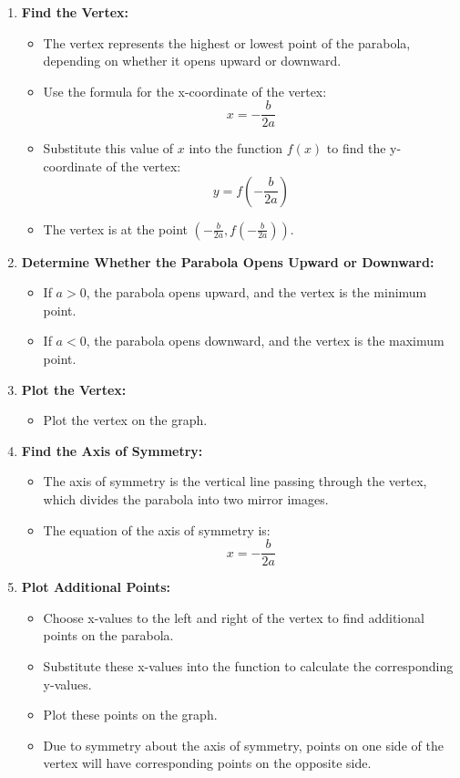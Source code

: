 \begin{enumerate}
    \item \textbf{Find the Vertex:}
    \begin{itemize}
        \item The vertex represents the highest or lowest point of the parabola, depending on whether it opens upward or downward.
        \item Use the formula for the x-coordinate of the vertex:
        \[
        x = -\frac{b}{2a}
        \]
        \item Substitute this value of \( x \) into the function \( f(x) \) to find the y-coordinate of the vertex:
        \[
        y = f\left( -\frac{b}{2a} \right)
        \]
        \item The vertex is at the point \(\left( -\frac{b}{2a}, f\left( -\frac{b}{2a} \right) \right)\).
    \end{itemize}
    
    \item \textbf{Determine Whether the Parabola Opens Upward or Downward:}
    \begin{itemize}
        \item If \( a > 0 \), the parabola opens upward, and the vertex is the minimum point.
        \item If \( a < 0 \), the parabola opens downward, and the vertex is the maximum point.
    \end{itemize}
    
    \item \textbf{Plot the Vertex:}
    \begin{itemize}
        \item Plot the vertex on the graph.
    \end{itemize}
    
    \item \textbf{Find the Axis of Symmetry:}
    \begin{itemize}
        \item The axis of symmetry is the vertical line passing through the vertex, which divides the parabola into two mirror images.
        \item The equation of the axis of symmetry is:
        \[
        x = -\frac{b}{2a}
        \]
    \end{itemize}
    
    \item \textbf{Plot Additional Points:}
    \begin{itemize}
        \item Choose x-values to the left and right of the vertex to find additional points on the parabola.
        \item Substitute these x-values into the function to calculate the corresponding y-values.
        \item Plot these points on the graph.
        \item Due to symmetry about the axis of symmetry, points on one side of the vertex will have corresponding points on the opposite side.
    \end{itemize}
    

\end{enumerate}
